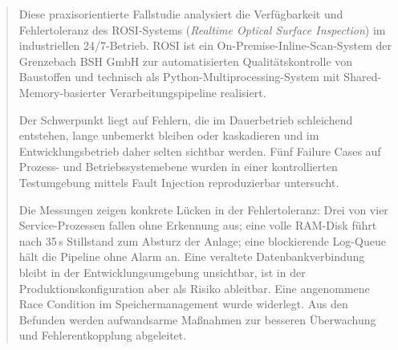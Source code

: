 
\begin{abstract}
    \justifying
    \setlength{\parindent}{0pt}
    \noindent Diese praxisorientierte Fallstudie analysiert die Verfügbarkeit und Fehlertoleranz
    des ROSI-Systems (\textit{Realtime Optical Surface Inspection}) im industriellen
    24/7-Betrieb. ROSI ist ein On-Premise-Inline-Scan-System der Grenzebach BSH GmbH
    zur automatisierten Qualitätskontrolle von Baustoffen und technisch als
    Python-Multiprocessing-System mit Shared-Memory-basierter Verarbeitungspipeline
    realisiert.

    Der Schwerpunkt liegt auf Fehlern, die im Dauerbetrieb schleichend entstehen, lange
    unbemerkt bleiben oder kaskadieren und im Entwicklungsbetrieb daher selten sichtbar
    werden. Fünf Failure Cases auf Prozess- und Betriebssystemebene wurden in einer
    kontrollierten Testumgebung mittels Fault Injection reproduzierbar untersucht.

    Die Messungen zeigen konkrete Lücken in der Fehlertoleranz: Drei von vier
    Service-Prozessen fallen ohne Erkennung aus; eine volle RAM-Disk führt nach
    35\,s Stillstand zum Absturz der Anlage; eine blockierende Log-Queue hält die
    Pipeline ohne Alarm an. Eine veraltete Datenbankverbindung bleibt in der
    Entwicklungsumgebung unsichtbar, ist in der Produktionskonfiguration aber als Risiko
    ableitbar. Eine angenommene Race Condition im Speichermanagement wurde widerlegt. Aus
    den Befunden werden aufwandsarme Maßnahmen zur besseren Überwachung und
    Fehlerentkopplung abgeleitet.
\end{abstract}
